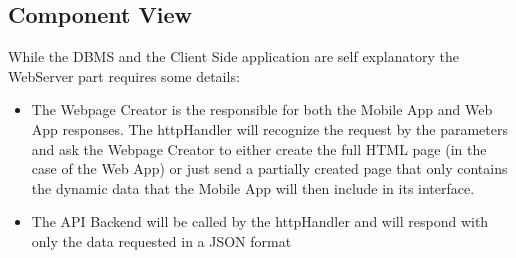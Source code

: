 \documentclass{article}
\begin{document}
	\subsection{Component View}
	\begin{figure}[H]
	\end{figure}
	While the DBMS and the Client Side application are self explanatory the WebServer part requires some details:
	\begin{itemize}
		\item The Webpage Creator is the responsible for both the Mobile App and Web App responses. The httpHandler will recognize the request by the parameters and ask the Webpage Creator to either create the full HTML page (in the case of the Web App) or just send a partially created page that only contains the dynamic data that the Mobile App will then include in its interface.
		\item The API Backend will be called by the httpHandler and will respond with only the data requested in a JSON format
	\end{itemize}
\end{document}
